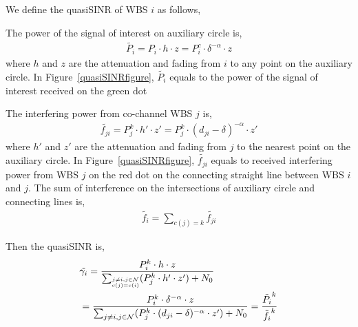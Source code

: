We define the quasiSINR of WBS $i$ as follows,

The power of the signal of interest on auxiliary circle is,
\begin{equation}
\label{quasiSINR_1}
\begin{aligned}
\tilde{P_i} = P_i\cdot h\cdot z = P_i^c\cdot \delta^{-\alpha}\cdot z
\end{aligned}
\end{equation}	
where $h$ and $z$ are the attenuation and fading from $i$ to any point on the auxiliary circle.
In Figure~\ref{quasiSINRfigure}, $\tilde{P_i}$ equals to the power of the signal of interest received on the green dot 

The interfering power from co-channel WBS $j$ is,
\begin{equation}
\label{quasiSINR_inf}
\begin{aligned}
\tilde{f_{ji}} = P_j^k\cdot h'\cdot z' = P_j^k\cdot (d_{ji}-\delta)^{-\alpha}\cdot z'
\end{aligned}
\end{equation}	
where $h'$ and $z'$ are the attenuation and fading from $j$ to the nearest point on the auxiliary circle.
In Figure~\ref{quasiSINRfigure}, $\tilde{f_{ji}}$ equals to received interfering power from WBS $j$ on the red dot on the connecting straight line between WBS $i$ and $j$.
The sum of interference on the intersections of auxiliary circle and connecting lines is, 
\begin{equation}
\label{quasiSINR_infs}
\begin{aligned}
\tilde{f_{i}} = \sum_{c(j)=k} \tilde{f_{ji}}
\end{aligned}
\end{equation}	

Then the quasiSINR is, 
\begin{equation}
\label{quasiSINR}
\begin{aligned}
& \tilde{\gamma_{i}} = \frac{P_{i}^k \cdot h \cdot z} {\sum_{\tiny\substack{j\neq i, j\in \mathcal{N}\\c(j)=c(i)}} (P_j^k \cdot h' \cdot z') + N_0}\\
& = \frac{P_{i}^k \cdot \delta^{-\alpha}\cdot z} {\sum_{j\neq i, j\in \mathcal{N}} (P_j^k \cdot (d_{ji}-\delta)^{-\alpha} \cdot z') + N_0} = \frac{\tilde{P_i}^k}{\tilde{f_i}^k}
\end{aligned}
\end{equation}

